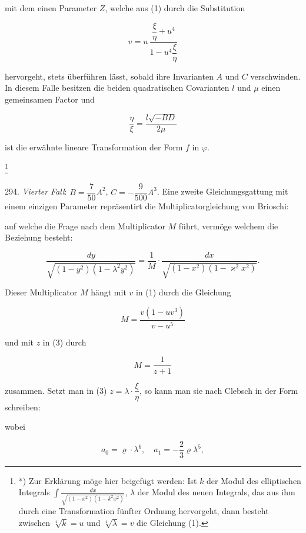 
mit dem einen Parameter $Z$, welche aus (1) durch die Substitution

\[
v = u\,\frac{\dfrac{\xi}{\eta} + u^4}{1 - u^4\dfrac{\xi}{\eta}}
\]

hervorgeht, stets überführen lässt, sobald ihre Invarianten $A$ und $C$ verschwinden. In diesem Falle besitzen die beiden quadratischen Covarianten $l$ und $\mu$ einen gemeinsamen Factor und

\[
\frac{\eta}{\xi} = \frac{l\sqrt{-BD}}{2\mu}
\]

ist die erwähnte lineare Transformation der Form $f$ in $\varphi$.

\footnote{*) Zur Erklärung möge hier beigefügt werden: Ist $k$ der Modul des elliptischen Integrals $\displaystyle\int\frac{dx}{\sqrt{(1-x^2)(1-k^2x^2)}}$, $\lambda$ der Modul des neuen Integrals, das aus ihm durch eine Transformation fünfter Ordnung hervorgeht, dann besteht zwischen $\sqrt[4]{k}=u$ und $\sqrt[4]{\lambda}=v$ die Gleichung (1).}



294. \textit{Vierter Fall}: $B=\dfrac{7}{50}A^2$, $C=-\dfrac{9}{500}A^3$. Eine zweite Gleichungsgattung mit einem einzigen Parameter repräsentirt die Multiplicatorgleichung von Brioschi:


auf welche die Frage nach dem Multiplicator $M$ führt, vermöge welchem die Beziehung besteht:

\[
\frac{dy}{\sqrt{(1-y^2)(1-\lambda^2y^2)}} = \frac{1}{M}\cdot\frac{dx}{\sqrt{(1-x^2)(1-\varkappa^2x^2)}}.
\]

Dieser Multiplicator $M$ hängt mit $v$ in (1) durch die Gleichung

\[
M = \frac{v(1-uv^3)}{v-u^5}
\]

und mit $z$ in (3) durch

\[
M = \frac{1}{z+1}
\]

zusammen. Setzt man in (3) $z=\lambda\cdot\dfrac{\xi}{\eta}$, so kann man sie nach Clebsch in der Form schreiben:


wobei

\[
a_0 = \varrho\cdot\lambda^6, \quad a_1 = -\frac{2}{3}\varrho\lambda^5,
\]

